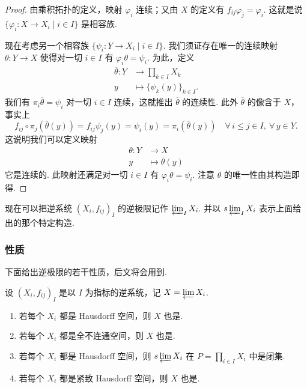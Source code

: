 \begin{proof}
由乘积拓扑的定义，映射 $\varphi_i$ 连续；又由 $X$ 的定义有 $f_{ij}\varphi_j=\varphi_i$. 这就是说 $\{\varphi_i:X\to X_i\mid i\in I\}$ 是相容族.

现在考虑另一个相容族 $\{\psi_i:Y\to X_i\mid i\in I\}$. 我们须证存在唯一的连续映射 $\theta:Y\to X$ 使得对一切 $i\in I$ 有 $\varphi_i\theta=\psi_i$. 为此，定义
\[
\begin{aligned}
\overline{\theta}:Y&\longrightarrow\prod_{k\in I}X_k\\
y&\longmapsto\{\psi_k(y)\}_{k\in I}.
\end{aligned}
\]
我们有 $\pi_i\overline{\theta}=\psi_i$ 对一切 $i\in I$ 连续，这就推出 $\overline{\theta}$ 的连续性. 此外 $\overline{\theta}$ 的像含于 $X$，事实上
\[
f_{ij}\circ\pi_j(\overline{\theta}(y))=f_{ij}\psi_j(y)=\psi_i(y)=\pi_i(\overline{\theta}(y))\quad\forall\, i\leq j\in I,\ \forall\, y\in Y.
\]
这说明我们可以定义映射
\[
\begin{aligned}
\theta:Y&\longrightarrow X\\
y&\longmapsto\overline{\theta}(y)
\end{aligned}
\]
它是连续的. 此映射还满足对一切 $i\in I$ 有 $\varphi_i\theta=\psi_i$. 注意 $\theta$ 的唯一性由其构造即得.
\end{proof}

\begin{notation}\label{c3-not-1-9}
现在可以把逆系统 $(X_i,f_{ij})_I$ 的逆极限记作 $\varprojlim_I X_i$. 并以 $s\varprojlim_I X_i$ 表示上面给出的那个特定构造.
\end{notation}

\subsubsection{性质}

下面给出逆极限的若干性质，后文将会用到.

\begin{proposition}\label{c3-prop-1-3}
设 $(X_i,f_{ij})_I$ 是以 $I$ 为指标的逆系统，记 $X=\varprojlim X_i$.
\begin{enumerate}[label=(\arabic*),leftmargin=*]
    \item 若每个 $X_i$ 都是 Hausdorff 空间，则 $X$ 也是.
    \item 若每个 $X_i$ 都是全不连通空间，则 $X$ 也是.
    \item 若每个 $X_i$ 都是 Hausdorff 空间，则 $s\varprojlim X_i$ 在 $P=\prod_{i\in I}X_i$ 中是闭集.
    \item 若每个 $X_i$ 都是紧致 Hausdorff 空间，则 $X$ 也是.
\end{enumerate}
\end{proposition}

